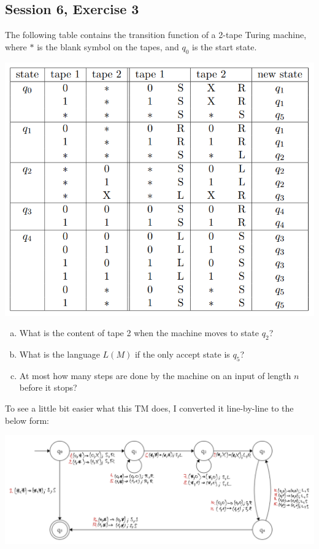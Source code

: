 \subsection {Session 6, Exercise 3}


The following table contains the transition function of a 2-tape Turing machine, where $*$ is the blank symbol on the tapes, and $q_0$ is the start state.

\begin{center}
\includegraphics[width=0.7\linewidth]{06/6_3_task.png}
\end{center}

\begin{enumerate}[a)]
    \item What is the content of tape 2 when the machine moves to state $q_2$?
    \item What is the language $L(M)$ if the only accept state is $q_5$?
    \item At most how many steps are done by the machine on an input of length $n$ before it stops?
\end{enumerate}


To see a little bit easier what this TM does, I converted it line-by-line to the below form:

\includegraphics[width=\linewidth]{06/6_3_canvas.png}

